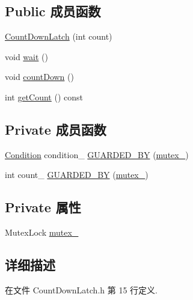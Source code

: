 \subsection*{Public 成员函数}
\begin{DoxyCompactItemize}
\item 
\hyperlink{classmuduo_1_1CountDownLatch_a088ee7e5fc7c0ec64f76df9b63585269}{Count\+Down\+Latch} (int count)
\item 
void \hyperlink{classmuduo_1_1CountDownLatch_aa3b21853f890838c88d047d6c2786917}{wait} ()
\item 
void \hyperlink{classmuduo_1_1CountDownLatch_aa29e88c9b576a46af3621ba82d733d65}{count\+Down} ()
\item 
int \hyperlink{classmuduo_1_1CountDownLatch_a2cb8f537f9651db1e57caa0b5eff57d3}{get\+Count} () const
\end{DoxyCompactItemize}
\subsection*{Private 成员函数}
\begin{DoxyCompactItemize}
\item 
\hyperlink{classmuduo_1_1Condition}{Condition} condition\+\_\+ \hyperlink{classmuduo_1_1CountDownLatch_a84a7d06f3d223e0c95f5cdb3d98d016a}{G\+U\+A\+R\+D\+E\+D\+\_\+\+BY} (\hyperlink{classmuduo_1_1CountDownLatch_a6e1bf1809a42f40f1a21178dc6620a6f}{mutex\+\_\+})
\item 
int count\+\_\+ \hyperlink{classmuduo_1_1CountDownLatch_ad866ab6452faa1c7e316f733caf18580}{G\+U\+A\+R\+D\+E\+D\+\_\+\+BY} (\hyperlink{classmuduo_1_1CountDownLatch_a6e1bf1809a42f40f1a21178dc6620a6f}{mutex\+\_\+})
\end{DoxyCompactItemize}
\subsection*{Private 属性}
\begin{DoxyCompactItemize}
\item 
Mutex\+Lock \hyperlink{classmuduo_1_1CountDownLatch_a6e1bf1809a42f40f1a21178dc6620a6f}{mutex\+\_\+}
\end{DoxyCompactItemize}


\subsection{详细描述}


在文件 Count\+Down\+Latch.\+h 第 15 行定义.



